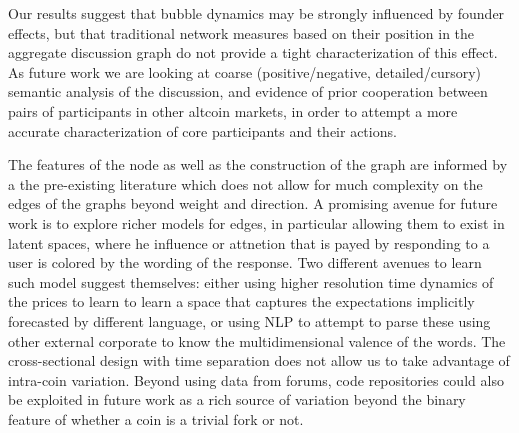 Our results suggest that bubble dynamics may be strongly influenced by founder effects, but that traditional network measures based on their position in the aggregate discussion graph do not provide a tight characterization of this effect.
As future work we are looking at coarse (positive/negative, detailed/cursory) semantic analysis of the discussion, and evidence of prior cooperation between pairs of participants in other altcoin markets, in order to attempt a more accurate characterization of core participants and their actions.

The features of the node as well as the construction of the graph are informed by a the pre-existing literature which does not allow for much complexity on the edges of the graphs beyond weight and direction.
A promising avenue for future work is to explore richer models for edges, in particular allowing them to exist in latent spaces, where he influence or attnetion that is payed by responding to a user is colored by the wording of the response. 
Two different avenues to learn such model suggest themselves: either using higher resolution time dynamics of the prices to learn to learn a space that captures the expectations implicitly forecasted by different language, or using NLP to attempt to parse these using other external corporate to know the multidimensional valence of the words.
The cross-sectional design with time separation does not allow us to take advantage of intra-coin variation.
Beyond using data from forums, code repositories could also be exploited in future work as a rich source of variation beyond the binary feature of whether a coin is a trivial fork or not.
